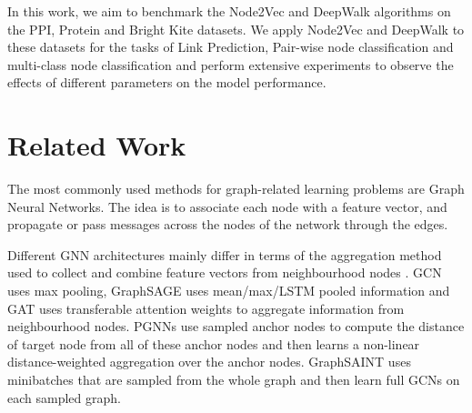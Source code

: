 \documentclass[sigconf]{acmart}
\begin{document}
In this work, we aim to benchmark the Node2Vec and DeepWalk algorithms on the PPI, Protein and Bright Kite datasets. We apply Node2Vec and DeepWalk to these datasets for the tasks of Link Prediction, Pair-wise node classification and multi-class node classification and perform extensive experiments to observe the effects of different parameters on the model performance.

\section{Related Work}
The most commonly used methods for graph-related learning problems are Graph Neural Networks. The idea is to associate each node with a feature vector, and propagate or pass messages across the nodes of the network through the edges. 

Different GNN architectures mainly differ in terms of the aggregation method used to collect and combine feature vectors from neighbourhood nodes \cite{you2019position}.
GCN \cite{Kipf2017SemiSupervisedCW} uses max pooling, GraphSAGE \cite{Hamilton2017InductiveRL} uses mean/max/LSTM pooled information and GAT \cite{velivckovic2017graph} uses transferable attention weights to aggregate information from neighbourhood nodes. PGNNs \cite{you2019position} use sampled anchor nodes to compute the distance of target node from all of these anchor nodes and then learns a non-linear distance-weighted aggregation over the anchor nodes. GraphSAINT \cite{Zeng2020GraphSAINT} uses minibatches that are sampled from the whole graph and then learn full GCNs on each sampled graph. 
\end{document}
